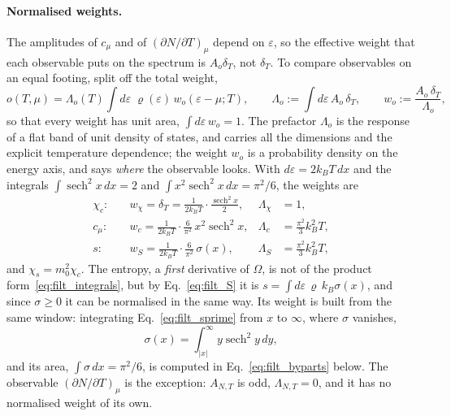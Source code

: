 \documentclass[10pt,a4paper]{article}
\theoremstyle{plain}
\theoremstyle{remark}
\begin{document}
\paragraph{Normalised weights.} The amplitudes of $ c_\mu $ and of
$ (\partial N/\partial T)_\mu $ depend on $ \varepsilon $, so the effective weight
that each observable puts on the spectrum is $ A_o\delta_T $, not $ \delta_T $. To
compare observables on an equal footing, split off the total weight,
\begin{equation}\label{eq:filt_norm}
o(T,\mu)=\Lambda_o(T)\int d\varepsilon\;\varrho(\varepsilon)\,w_o(\varepsilon-\mu;T),
\qquad
\Lambda_o:=\int d\varepsilon\,A_o\,\delta_T,
\qquad
w_o:=\frac{A_o\,\delta_T}{\Lambda_o},
\end{equation}
so that every weight has unit area, $ \int d\varepsilon\,w_o = 1 $. The prefactor
$ \Lambda_o $ is the response of a flat band of unit density of states, and
carries all the dimensions and the explicit temperature dependence; the weight
$ w_o $ is a probability density on the energy axis, and says \emph{where} the
observable looks. With $ d\varepsilon = 2k_BT\,dx $ and the integrals
$ \int\operatorname{sech}^{2}x\,dx = 2 $ and
$ \int x^{2}\operatorname{sech}^{2}x\,dx = \pi^{2}/6 $, the weights are
\begin{equation}\label{eq:filt_kernels}
\begin{aligned}
\chi_c:&\quad w_\chi=\delta_T=\frac{1}{2k_BT}\cdot\frac{\operatorname{sech}^{2}x}{2},
&\Lambda_\chi&=1,\\[2pt]
c_\mu:&\quad w_c=\frac{1}{2k_BT}\cdot\frac{6}{\pi^{2}}\,x^{2}\operatorname{sech}^{2}x,
&\Lambda_c&=\frac{\pi^{2}}{3}k_B^{2}T,\\[2pt]
s:&\quad w_S=\frac{1}{2k_BT}\cdot\frac{6}{\pi^{2}}\,\sigma(x),
&\Lambda_S&=\frac{\pi^{2}}{3}k_B^{2}T,
\end{aligned}
\end{equation}
and $ \chi_s = m_0^{2}\chi_c $. The entropy, a \emph{first} derivative of $ \Omega $,
is not of the product form~\eqref{eq:filt_integrals}, but by Eq.~\eqref{eq:filt_S}
it is $ s = \int d\varepsilon\,\varrho\,k_B\sigma(x) $, and since $ \sigma \geq 0 $ it can be
normalised in the same way. Its weight is built from the same window: integrating
Eq.~\eqref{eq:filt_sprime} from $ x $ to $ \infty $, where $ \sigma $ vanishes,
\[
  \sigma(x) = \int_{|x|}^{\infty} y\operatorname{sech}^{2}y\,dy ,
\]
and its area, $ \int\sigma\,dx = \pi^{2}/6 $, is computed in
Eq.~\eqref{eq:filt_byparts} below. The observable $ (\partial N/\partial T)_\mu $
is the exception: $ A_{N,T} $ is odd, $ \Lambda_{N,T} = 0 $, and it has no
normalised weight of its own.
\end{document}
